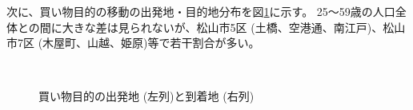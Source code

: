 \documentclass[a4paper,12pt, uplatex]{jsbook}
\begin{document}
次に、買い物目的の移動の出発地・目的地分布を図\ref{fig:od_shopping_income}に示す。
25〜59歳の人口全体との間に大きな差は見られないが、松山市5区 (土橋、空港通、南江戸)、松山市7区 (木屋町、山越、姫原)等で若干割合が多い。
%
\begin{figure}[htbp]
  \centering
  \\%
    \caption{買い物目的の出発地 (左列)と到着地 (右列)}
  	\label{fig:od_shopping_income}
\end{figure}
\end{document}
